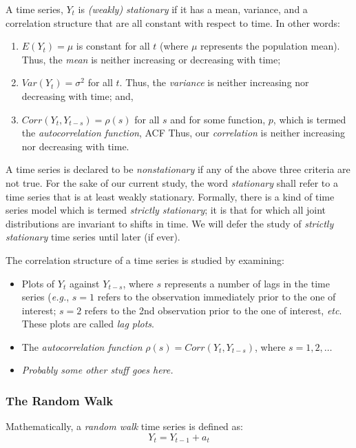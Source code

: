 \documentclass[12pt]{article}
\begin{document}
A time series, $Y_t$ is \textit{(weakly) stationary} if it has a mean, variance, and a correlation structure that are all constant with respect to time. In other words:
\begin{enumerate}
\item $E(Y_t) = \mu$ is constant for all $t$ (where $\mu$ represents the population mean). Thus, the \textit{mean} is neither increasing or decreasing with time;
\item $Var(Y_t) = {\sigma}^2$ for all $t$. Thus, the \textit{variance} is neither increasing nor decreasing with time; and,
\item $Corr(Y_t, Y_{t-s}) = \rho(s)$ for all $s$ and for some function, $p$, which is termed the \textit{autocorrelation function}, ACF Thus, our \textit{correlation} is neither increasing nor decreasing with time.
\end{enumerate}
A time series is declared to be \textit{nonstationary} if any of the above three criteria are not true. For the sake of our current study, the word \textit{stationary} shall refer to a time series that is at least weakly stationary. Formally, there is a kind of time series model which is termed \textit{strictly stationary}; it is that for which all joint distributions are invariant to shifts in time. We will defer the study of \textit{strictly stationary} time series until later (if ever).
 
The correlation structure of a time series is studied by examining:
\begin{itemize}
\item Plots of $Y_t$ against $Y_{t-s}$, where $s$ represents a number of lags in the time series (\textit{e.g.}, $s = 1$ refers to the observation immediately prior to the one of interest; $s = 2$ refers to the 2nd observation prior to the one of interest, \textit{etc}. These plots are called \textit{lag plots}.
\item The \textit{autocorrelation function} $\rho(s) = Corr(Y_t, Y_{t-s})$, where $s = 1, 2, \ldots$
\item \textit{Probably some other stuff goes here.}
\end{itemize}

\subsubsection{The Random Walk}
Mathematically, a \textit{random walk} time series is defined as:
\begin{equation}
Y_t = Y_{t-1} + a_t
\label{eqn:rndwlk1}
\end{equation}
\end{document}
